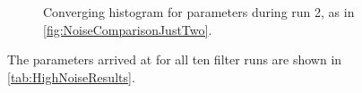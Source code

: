 \begin{figure}[H]
\label{fig:ConvergenceRuns2}
\caption{Converging histogram for parameters during run 2, as in \autoref{fig:NoiseComparisonJustTwo}.}
\end{figure}

The parameters arrived at for all ten filter runs are shown in \autoref{tab:HighNoiseResults}.

